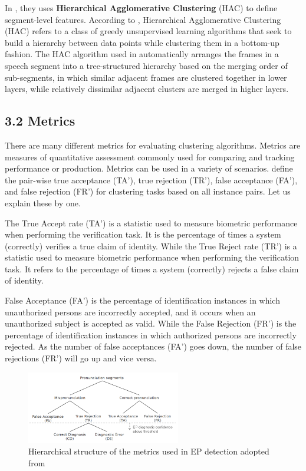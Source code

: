 \documentclass[nobib]{tufte-handout}
\begin{document}
In \cite{wang2015supervised}, they uses \textbf{Hierarchical Agglomerative Clustering} (HAC) to define segment-level features. According to \cite{chhabra2020fair}, Hierarchical Agglomerative Clustering (HAC) refers to a class of greedy unsupervised learning algorithms that seek to build a hierarchy between data points while clustering them in a bottom-up fashion. The HAC algorithm used in \cite{wang2015supervised} automatically arranges the frames in a speech segment into a tree-structured hierarchy based on the merging order of sub-segments, in which similar adjacent frames are clustered together in lower layers, while relatively dissimilar adjacent clusters are merged in higher layers. 


\subsection{\textbf{3.2 Metrics}}

There are many different metrics for evaluating clustering algorithms. 
Metrics are measures of quantitative assessment commonly used for comparing and tracking performance or production. Metrics can be used in a variety of scenarios.  \cite{wang2015supervised}  define the pair-wise true acceptance (TA’), true rejection (TR’), false acceptance (FA’), and false rejection (FR’) for clustering tasks based on all instance pairs. Let us explain these by one. 

The True Accept rate (TA’) is a statistic used to measure biometric performance when performing the verification task. It is the percentage of times a system (correctly) verifies a true claim of identity. While the True Reject rate (TR’) is a statistic used to measure biometric performance when performing the verification task. It refers to the percentage of times a system (correctly) rejects a false claim of identity.


False Acceptance (FA’) is the percentage of identification instances in which unauthorized persons are incorrectly accepted, and it occurs when an unauthorized subject is accepted as valid. While the False Rejection (FR') is the percentage of identification instances in which authorized persons are incorrectly rejected. As the number of false acceptances (FA') goes down, the number of false rejections (FR') will go up and vice versa.

\begin{figure}
 \includegraphics[width=0.6\textwidth]{metrics.png}
  \caption{Hierarchical structure of the metrics used in EP detection adopted from  \cite{wang2015supervised}}
\end{figure}
\end{document}
